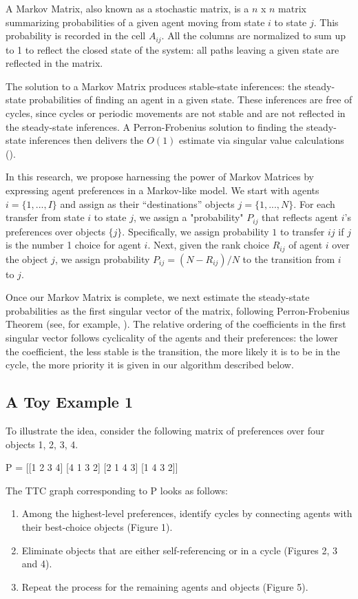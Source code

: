 A Markov Matrix, also known as a stochastic matrix, is a $n$ x $n$ matrix summarizing probabilities of a given agent moving from state $i$ to state $j$. This probability is recorded in the cell $A_{ij}$. All the columns are normalized to sum up to 1 to reflect the closed state of the system: all paths leaving a given state are reflected in the matrix. 

The solution to a Markov Matrix produces stable-state inferences: the steady-state probabilities of finding an agent in a given state. These inferences are free of cycles, since cycles or periodic movements are not stable and are not reflected in the steady-state inferences. A Perron-Frobenius solution to finding the steady-state inferences then delivers the $O(1)$ estimate via singular value calculations (\cite{SunEtAl2020}). 

In this research, we propose harnessing the power of Markov Matrices by expressing agent preferences in a Markov-like model. We start with agents $i = \{1,..., I\}$ and assign as their “destinations” objects $j = \{1,..., N\}$. For each transfer from state $i$ to state $j$, we assign a "probability" $P_{ij}$ that reflects agent $i$’s preferences over objects $\{j\}$. Specifically, we assign probability $1$ to transfer $ij$ if $j$ is the number 1 choice for agent $i$. Next, given the rank choice $R_{ij}$ of agent $i$ over the object $j$, we assign probability $P_{ij} = (N-R_{ij})/N$ to the transition from $i$ to $j$. 

Once our Markov Matrix is complete, we next estimate the steady-state probabilities as the first singular vector of the matrix, following Perron-Frobenius Theorem (see, for example, \cite{BigDataScienceInFinance}). The relative ordering of the coefficients in the first singular vector follows cyclicality of the agents and their preferences: the lower the coefficient, the less stable is the transition, the more likely it is to be in the cycle, the more priority it is given in our algorithm described below. 


\subsection{A Toy Example 1}
\textbf{}
To illustrate the idea, consider the following matrix of preferences over four objects {1, 2, 3, 4}. 

P =  	[[1 2 3 4]
 	[4 1 3 2]
 	[2 1 4 3]
 	[1 4 3 2]]


 
The TTC graph corresponding to P looks as follows: 
\begin{enumerate}
    \item Among the highest-level preferences, identify cycles by connecting agents with their best-choice objects (Figure 1). 
    \item Eliminate objects that are either self-referencing or in a cycle (Figures 2, 3 and 4).
    \item Repeat the process for the remaining agents and objects (Figure 5).
\end{enumerate}

